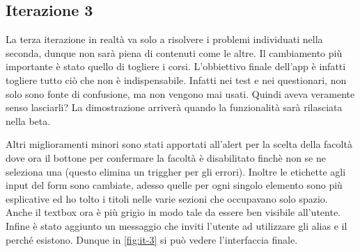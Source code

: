 \documentclass[Lau, oneside]{sapthesis}%
\begin{document}
\subsection{Iterazione 3}
La terza iterazione in realtà va solo a risolvere i problemi individuati nella seconda, dunque non sarà piena di contenuti come le altre.
Il cambiamento più importante è stato quello di togliere i corsi. L'obbiettivo finale dell'app è infatti togliere tutto ciò che non è indispensabile. Infatti nei test e nei questionari, non solo sono fonte di confusione, ma non vengono mai usati. Quindi aveva veramente senso lasciarli? La dimostrazione arriverà quando la funzionalità sarà rilasciata nella beta.

Altri miglioramenti minori sono stati apportati all'alert per la scelta della facoltà dove ora il bottone per confermare la facoltà è disabilitato finchè non se ne seleziona una (questo elimina un triggher per gli errori). Inoltre le etichette agli input del form sono cambiate, adesso quelle per ogni singolo elemento sono più esplicative ed ho tolto i titoli nelle varie sezioni che occupavano solo spazio. Anche il textbox ora è più grigio in modo tale da essere ben visibile all'utente. Infine è stato aggiunto un messaggio che inviti l'utente ad utilizzare gli alias e il perché esistono. Dunque in \ref{fig:it-3} si può vedere l'interfaccia finale.
\end{document}

